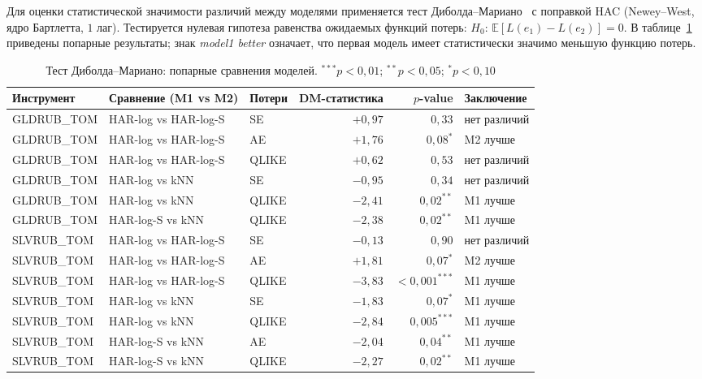 Для оценки статистической значимости различий между моделями
применяется тест Диболда--Мариано~\cite{Diebold1995} с поправкой
HAC (Newey--West, ядро Бартлетта, $1$ лаг).
Тестируется нулевая гипотеза равенства ожидаемых функций потерь:
$H_0:\, \mathbb{E}[L(e_1) - L(e_2)] = 0$.
В таблице~\ref{tab:dm_test} приведены попарные результаты;
знак \textit{model1 better} означает, что первая модель имеет
статистически значимо меньшую функцию потерь.

\begin{table}[H]
\centering
\caption{Тест Диболда--Мариано: попарные сравнения моделей.
         {$^{***}p<0{,}01$; $^{**}p<0{,}05$; $^{*}p<0{,}10$}}
\label{tab:dm_test}
\small
\begin{tabular}{lllrrl}
\hline
Инструмент & Сравнение (M1 vs M2) & Потери & DM-статистика & $p$-value & Заключение \\
\hline
GLDRUB\_TOM & HAR-log vs HAR-log-S & SE     & $+0{,}97$  & $0{,}33$       & нет различий \\
GLDRUB\_TOM & HAR-log vs HAR-log-S & AE     & $+1{,}76$  & $0{,}08^{*}$   & M2 лучше \\
GLDRUB\_TOM & HAR-log vs HAR-log-S & QLIKE  & $+0{,}62$  & $0{,}53$       & нет различий \\
GLDRUB\_TOM & HAR-log vs kNN       & SE     & $-0{,}95$  & $0{,}34$       & нет различий \\
GLDRUB\_TOM & HAR-log vs kNN       & QLIKE  & $-2{,}41$  & $0{,}02^{**}$  & M1 лучше \\
GLDRUB\_TOM & HAR-log-S vs kNN     & QLIKE  & $-2{,}38$  & $0{,}02^{**}$  & M1 лучше \\
\hline
SLVRUB\_TOM & HAR-log vs HAR-log-S & SE     & $-0{,}13$  & $0{,}90$       & нет различий \\
SLVRUB\_TOM & HAR-log vs HAR-log-S & AE     & $+1{,}81$  & $0{,}07^{*}$   & M2 лучше \\
SLVRUB\_TOM & HAR-log vs HAR-log-S & QLIKE  & $-3{,}83$  & $<\!0{,}001^{***}$ & M1 лучше \\
SLVRUB\_TOM & HAR-log vs kNN       & SE     & $-1{,}83$  & $0{,}07^{*}$   & M1 лучше \\
SLVRUB\_TOM & HAR-log vs kNN       & QLIKE  & $-2{,}84$  & $0{,}005^{***}$& M1 лучше \\
SLVRUB\_TOM & HAR-log-S vs kNN     & AE     & $-2{,}04$  & $0{,}04^{**}$  & M1 лучше \\
SLVRUB\_TOM & HAR-log-S vs kNN     & QLIKE  & $-2{,}27$  & $0{,}02^{**}$  & M1 лучше \\
\hline
\end{tabular}
\end{table}

